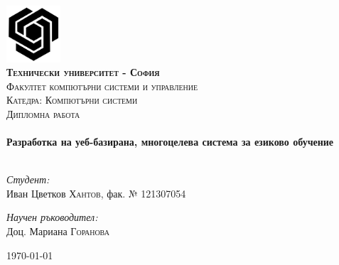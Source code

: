 \begin{titlepage}

\begin{center}


\includegraphics[width=0.15\textwidth]{images/tu-logo-big.png}\\[1cm]    

\textsc{\LARGE \bfseries Технически университет - София}\\[0.5cm]
\textsc{\Large Факултет компютърни системи и управление}\\[1.0cm]
\textsc{\Large Катедра: Компютърни системи}\\[1.0cm]

\textsc{\Large Дипломна работа}\\[0.5cm]


\HRule \\[0.4cm]
{ \huge \bfseries Разработка на уеб-базирана, многоцелева система за езиково
             обучение}\\[0.4cm]

\HRule \\[1.5cm]

\begin{minipage}{0.4\textwidth}
\begin{flushleft} \large
\emph{Студент:}\\
Иван Цветков \textsc{Хантов}, фак. № 121307054
\end{flushleft}
\end{minipage}
\begin{minipage}{0.4\textwidth}
\begin{flushright} \large
\emph{Научен ръководител:} \\
Доц. Мариана \textsc{Горанова}
\end{flushright}
\end{minipage}

\vfill

{\large \today}

\end{center}

\end{titlepage}

